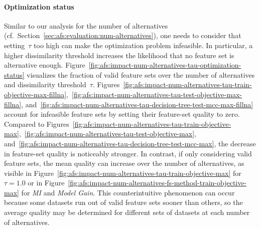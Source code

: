 \documentclass{article}
\theoremstyle{definition}
\begin{document}
\paragraph{Optimization status}

Similar to our analysis for the number of alternatives (cf.~Section~\ref{sec:afs:evaluation:num-alternatives}), one needs to consider that setting~$\tau$ too high can make the optimization problem infeasible.
In particular, a higher dissimilarity threshold increases the likelihood that no feature set is alternative enough.
Figure~\ref{fig:afs:impact-num-alternatives-tau-optimization-status} visualizes the fraction of valid feature sets over the number of alternatives and dissimilarity threshold~$\tau$.
Figures~\ref{fig:afs:impact-num-alternatives-tau-train-objective-max-fillna},~\ref{fig:afs:impact-num-alternatives-tau-test-objective-max-fillna}, and~\ref{fig:afs:impact-num-alternatives-tau-decision-tree-test-mcc-max-fillna} account for infeasible feature sets by setting their feature-set quality to zero.
Compared to Figures~\ref{fig:afs:impact-num-alternatives-tau-train-objective-max},~\ref{fig:afs:impact-num-alternatives-tau-test-objective-max}, and~\ref{fig:afs:impact-num-alternatives-tau-decision-tree-test-mcc-max}, the decrease in feature-set quality is noticeably stronger.
In contrast, if only considering valid feature sets, the mean quality can increase over the number of alternatives, as visible in Figure~\ref{fig:afs:impact-num-alternatives-tau-train-objective-max} for $\tau=1.0$ or in Figure~\ref{fig:afs:impact-num-alternatives-fs-method-train-objective-max} for \emph{MI} and \emph{Model Gain}.
This counterintuitive phenomenon can occur because some datasets run out of valid feature sets sooner than others, so the average quality may be determined for different sets of datasets at each number of alternatives.
\end{document}
